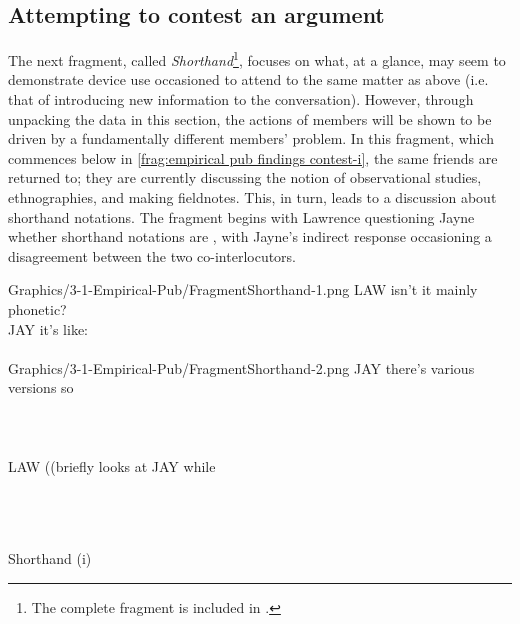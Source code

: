 \subsection{Attempting to contest an argument}\label{sec:empirical pub findings contest}
\begin{revisedsubmission}
The next fragment, called \textit{Shorthand}\footnote{The complete fragment is included in .}, focuses on what, at a glance, may seem to demonstrate device use occasioned to attend to the same matter as above (i.e. that of introducing new information to the conversation).
However, through unpacking the data in this section, the actions of members will be shown to be driven by a fundamentally different members' problem.
In this fragment, which commences below in \autoref{frag:empirical pub findings contest-i}, the same friends are returned to; they are currently discussing the notion of observational studies, ethnographies, and making fieldnotes.
This, in turn, leads to a discussion about shorthand notations.
The fragment begins with Lawrence questioning Jayne whether shorthand notations are , with Jayne's indirect response occasioning a disagreement between the two co-interlocutors.

\begin{inlinefrag*}
    {
    \begin{transcript*}
           {Graphics/3-1-Empirical-Pub/FragmentShorthand-1.png}
        \by LAW {isn't it mainly phonetic?} \\
        \by JAY {it's like:\vspace*{1.65cm}} \\
         \\
           {Graphics/3-1-Empirical-Pub/FragmentShorthand-2.png}
        \by JAY {there's various versions so} \\
         \\
         \\
         \\
        \by  LAW {((briefly looks at JAY while } \\
         \\
         \\
         \\
    \end{transcript*}
    \caption{Shorthand (i)}\label{frag:empirical pub findings contest-i}
    }
\end{inlinefrag*}


\end{revisedsubmission}
